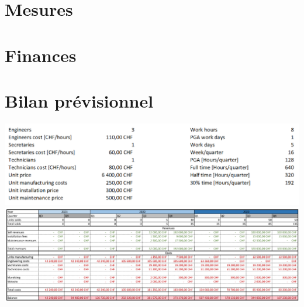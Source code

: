 \documentclass[11pt,titlepage]{report}
\begin{document}
\chapter{Mesures}


\chapter{Finances}



%

%

%

%

%

\appendix

\chapter{Bilan prévisionnel}
\includegraphics[width=\textwidth]{Images/business/costs.png}
\newpage
\includegraphics[angle=90, height=\textheight]{Images/business/bilan.png}
\end{document}
